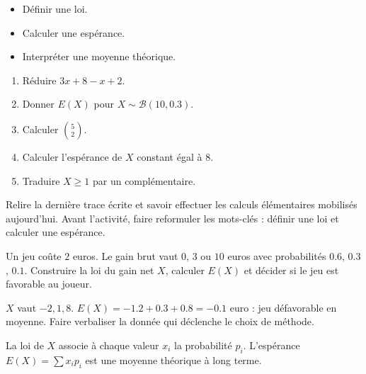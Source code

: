 \begin{objectives}\begin{itemize}\item Définir une loi.\item Calculer une espérance.\item Interpréter une moyenne théorique.\end{itemize}\end{objectives}
\begin{fluency}\begin{enumerate}\item Réduire $3x+8-x+2$. \item Donner $E(X)$ pour $X\sim\mathcal B(10,\num{0,3})$. \item Calculer $\binom52$. \item Calculer l'espérance de $X$ constant égal à $8$. \item Traduire $X\geq1$ par un complémentaire. \end{enumerate}\end{fluency}
\begin{prerequisites}Relire la dernière trace écrite et savoir effectuer les calculs élémentaires mobilisés aujourd'hui. Avant l'activité, faire reformuler les mots-clés : définir une loi et calculer une espérance.\end{prerequisites}

\begin{activity}
Un jeu coûte $2$ euros. Le gain brut vaut $0$, $3$ ou $10$ euros avec probabilités $\num{0,6}$, $\num{0,3}$, $\num{0,1}$. Construire la loi du gain net $X$, calculer $E(X)$ et décider si le jeu est favorable au joueur.

\end{activity}
\begin{solution}$X$ vaut $-2,1,8$. $E(X)=-\num{1,2}+\num{0,3}+\num{0,8}=-\num{0,1}$ euro : jeu défavorable en moyenne. Faire verbaliser la donnée qui déclenche le choix de méthode.\end{solution}

\begin{summary}La loi de $X$ associe à chaque valeur $x_i$ la probabilité $p_i$. L'espérance $E(X)=\sum x_ip_i$ est une moyenne théorique à long terme.\end{summary}


